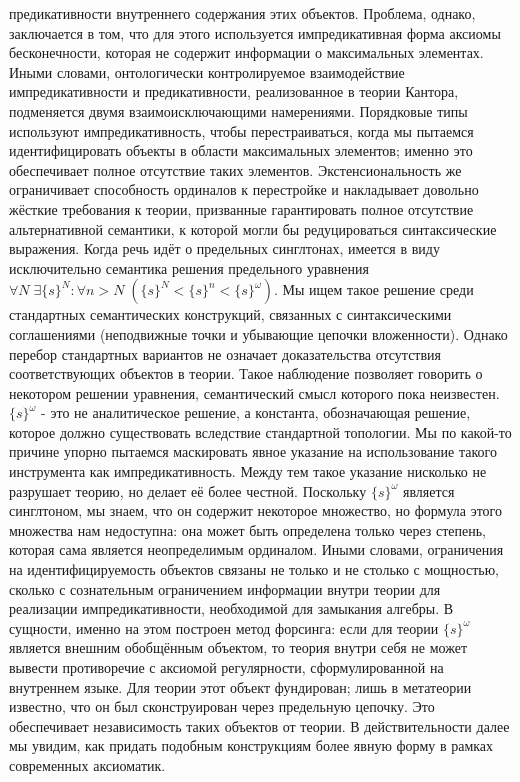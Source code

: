 \documentclass[12pt]{article}
\begin{document}
предикативности внутреннего содержания этих объектов. Проблема, однако, заключается в том, что для этого используется импредикативная форма аксиомы бесконечности, которая не содержит информации о максимальных элементах. Иными словами, онтологически контролируемое взаимодействие импредикативности и предикативности, реализованное в теории Кантора, подменяется двумя взаимоисключающими намерениями. Порядковые типы используют импредикативность, чтобы перестраиваться, когда мы пытаемся идентифицировать объекты в области максимальных элементов; именно это обеспечивает полное отсутствие таких элементов. Экстенсиональность же ограничивает способность ординалов к перестройке и накладывает довольно жёсткие требования к теории, призванные гарантировать полное отсутствие альтернативной семантики, к которой могли бы редуцироваться синтаксические выражения. Когда речь идёт о предельных синглтонах, имеется в виду исключительно семантика решения предельного уравнения $\forall N \; \exists \{ s \}^{N} : \forall n > N \; (\{ s \}^{N} < \{ s \}^{n} < \{ s \}^{\omega})$. Мы ищем такое решение среди стандартных семантических конструкций, связанных с синтаксическими соглашениями (неподвижные точки и убывающие цепочки вложенности). Однако перебор стандартных вариантов не означает доказательства отсутствия соответствующих объектов в теории. Такое наблюдение позволяет говорить о некотором решении уравнения, семантический смысл которого пока неизвестен. $\{ s \}^{\omega}$ - это не аналитическое решение, а константа, обозначающая решение, которое должно существовать вследствие стандартной топологии. Мы по какой-то причине упорно пытаемся маскировать явное указание на использование такого инструмента как импредикативность. Между тем такое указание нисколько не разрушает теорию, но делает её более честной. Поскольку $\{ s \}^{\omega}$ является синглтоном, мы знаем, что он содержит некоторое множество, но формула этого множества нам недоступна: она может быть определена только через степень, которая сама является неопределимым ординалом. Иными словами, ограничения на идентифицируемость объектов связаны не только и не столько с мощностью, сколько с сознательным ограничением информации внутри теории для реализации импредикативности, необходимой для замыкания алгебры. В сущности, именно на этом построен метод форсинга: если для теории $\{s\}^{\omega}$ является внешним обобщённым объектом, то теория внутри себя не может вывести противоречие с аксиомой регулярности, сформулированной на внутреннем языке. Для теории этот объект фундирован; лишь в метатеории известно, что он был сконструирован через предельную цепочку. Это обеспечивает независимость таких объектов от теории. В действительности далее мы увидим, как придать подобным конструкциям более явную форму в рамках современных аксиоматик.
\end{document}
